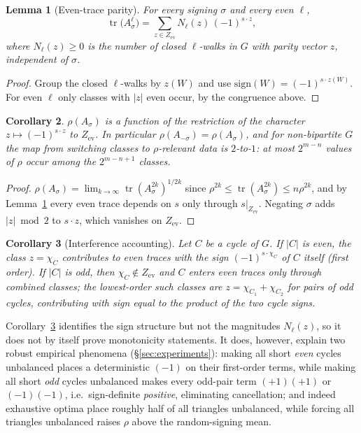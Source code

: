 \documentclass[11pt]{article}
\newtheorem{lemma}{Lemma}
\newtheorem{corollary}[lemma]{Corollary}
\theoremstyle{remark}
\newcommand{\Ze}{Z_{\mathrm{ev}}}
\newcommand{\rhomax}{\rho}
\DeclareMathOperator{\tr}{tr}
\begin{document}
\begin{lemma}[Even-trace parity]\label{lem:parity}
For every signing $\sigma$ and every even $\ell$,
\[
\tr\!\big(A_\sigma^{\ell}\big)
=\sum_{z\in \Ze} N_\ell(z)\,(-1)^{s\cdot z},
\]
where $N_\ell(z)\ge0$ is the number of closed $\ell$-walks in $G$ with
parity vector $z$, independent of $\sigma$.
\end{lemma}

\begin{proof}
Group the closed $\ell$-walks by $z(W)$ and use
$\mathrm{sign}(W)=(-1)^{s\cdot z(W)}$. For even $\ell$ only classes with
$|z|$ even occur, by the congruence above.
\end{proof}

\begin{corollary}\label{cor:evenchar}
$\rhomax(A_\sigma)$ is a function of the restriction of the character
$z\mapsto(-1)^{s\cdot z}$ to $\Ze$. In particular
$\rhomax(A_{-\sigma})=\rhomax(A_\sigma)$, and for non-bipartite $G$ the
map from switching classes to $\rhomax$-relevant data is $2$-to-$1$: at
most $2^{m-n}$ values of $\rhomax$ occur among the $2^{m-n+1}$ classes.
\end{corollary}

\begin{proof}
$\rhomax(A_\sigma)=\lim_{k\to\infty}\tr(A_\sigma^{2k})^{1/2k}$ since
$\rhomax^{2k}\le\tr(A_\sigma^{2k})\le n\rhomax^{2k}$, and by
Lemma~\ref{lem:parity} every even trace depends on $s$ only through
$s|_{\Ze}$. Negating $\sigma$ adds $|z|\bmod 2$ to $s\cdot z$, which
vanishes on $\Ze$.
\end{proof}

\begin{corollary}[Interference accounting]\label{cor:interference}
Let $C$ be a cycle of $G$.
If $|C|$ is even, the class $z=\chi_C$ contributes to even traces with
the sign $(-1)^{s\cdot\chi_C}$ of $C$ itself (first order). If $|C|$ is
odd, then $\chi_C\notin\Ze$ and $C$ enters even traces only through
combined classes; the lowest-order such classes are
$z=\chi_{C_1}+\chi_{C_2}$ for pairs of odd cycles, contributing with sign
equal to the \emph{product} of the two cycle signs.
\end{corollary}

Corollary~\ref{cor:interference} identifies the sign structure but not
the magnitudes $N_\ell(z)$, so it does not by itself prove monotonicity
statements. It does, however, explain two robust empirical phenomena
(\S\ref{sec:experiments}): making all short \emph{even} cycles unbalanced
places a deterministic $(-1)$ on their first-order terms, while making
all short \emph{odd} cycles unbalanced makes every odd-pair term
$(+1)(+1)$ or $(-1)(-1)$, i.e.\ sign-definite \emph{positive},
eliminating cancellation; and indeed exhaustive optima place roughly half
of all triangles unbalanced, while forcing all triangles unbalanced
raises $\rhomax$ above the random-signing mean.
\end{document}
